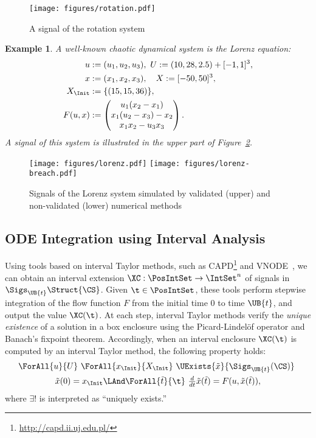 \documentclass[paper]{ieice}
\newtheorem{example}{Example}
\begin{document}
\begin{figure}[th]
\centering
\vspace{-1em}
\texttt{[image: figures/rotation.pdf]}
\caption{A signal of the rotation system}
\label{f:rotation}
\end{figure}

\begin{example} \label{ex:lorenz}
	A well-known chaotic dynamical system is the Lorenz equation:
	\begin{align*}
		u &:= (u_1,u_2,u_3), ~ U := (10,28,2.5)+[-1,1]^3, \\
		x &:= (x_1,x_2,x_3), \quad X := [-50,50]^3, \\
		X_\Init &:= \{(15, 15, 36)\}, \\
		F(u,x) &:= 
		\begin{pmatrix}
			u_1(x_2-x_1) \\  x_1(u_2-x_3) - x_2 \\ x_1 x_2 - u_3 x_3
		\end{pmatrix}.
	\end{align*}
A signal of this system is illustrated in the upper part of Figure~\ref{f:lorenz}.
\end{example}

\begin{figure}[th]
\centering
\texttt{[image: figures/lorenz.pdf]}
\texttt{[image: figures/lorenz-breach.pdf]}
\caption{Signals of the Lorenz system simulated by validated (upper) and non-validated (lower) numerical methods}
\label{f:lorenz}
\end{figure}


\subsection{ODE Integration using Interval Analysis}
\label{s:ode}

Using tools based on interval Taylor methods, such as CAPD\footnote{\url{http://capd.ii.uj.edu.pl/}} and VNODE~\cite{Nedialkov2006}, we can obtain an interval extension $\XC : \PosIntSet\to\IntSet^n$ of signals in $\Sigs_{\UB{t}}{\Struct{\CS}}$.
Given $\t \in {\PosIntSet}$, these tools perform stepwise integration of the flow function $F$ from the initial time $0$ to time $\UB{t}$, and output the value $\XC(\t)$.
At each step, interval Taylor methods verify the \emph{unique existence} of a solution in a box enclosure using the Picard-Lindel\"{o}f operator and Banach's fixpoint theorem.
Accordingly, when an interval enclosure $\XC(\t)$ is computed by an interval Taylor method, the following property holds:
\begin{gather*} \label{e:ode:unique}
	\ForAll{u}{U} ~ \ForAll{x_\Init}{X_\Init} ~ 
	\UExists{\tilde{x}}{\Sigs_{\UB{t}}(\CS)} ~ \\ \tilde{x}(0)=x_\Init \LAnd 
	\ForAll{\tilde{t}}{\t}~
	\tfrac{d}{dt} \tilde{x}(\tilde{t}) = F(u,\tilde{x}(\tilde{t})),
\end{gather*}
where $\exists!$ is interpreted as ``uniquely exists.''
\end{document}
